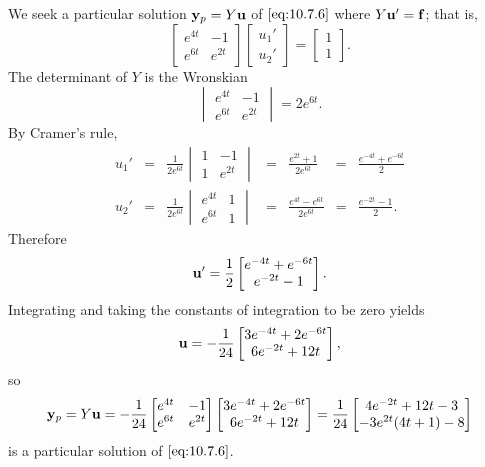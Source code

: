 \documentclass{ximera}
\begin{document}
\begin{example}
\begin{explanation}
We seek a particular solution
${\bf y}_p=Y{\bf u}$ of $\eqref{eq:10.7.6}$ where
 $Y{\bf u}'={\bf f}$; that is,
$$
\begin{bmatrix} e^{4t}&-1\\e^{6t}&e^{2t}\end{bmatrix}
\begin{bmatrix}u_1'\\u_2'\end{bmatrix}=\begin{bmatrix}1\\1\end{bmatrix}.
$$
The determinant of $Y$ is the Wronskian
$$
\begin{vmatrix}
e^{4t}&-1\\e^{6t}&e^{2t}\end{vmatrix}=2e^{6t}.
$$
By Cramer's rule,
$$
\begin{array}{cccccll}
u_1'&=&\frac{1}{2e^{6t}}\begin{vmatrix}1&-1\\1&e^{2t}
\end{vmatrix}&=&\frac{e^{2t}+1}{2e^{6t}}&=&\frac{e^{-4t}+e^{-6t}}{2}
\\
u_2'&=&\frac{1}{2e^{6t}}\begin{vmatrix}e^{4t}&1\\e^{6t}&1
\end{vmatrix}&=&\frac{e^{4t}-e^{6t}}{2e^{6t}}&=&\frac{e^{-2t}-1}{2}.
\end{array}
$$
Therefore
$$
{\bf
u}'=\frac{1}{2}\begin{bmatrix}e^{-4t}+e^{-6t}\\e^{-2t}-1\end{bmatrix}.
$$
Integrating  and taking the constants of integration to be zero yields
$$
{\bf
u}=-\frac{1}{24}\begin{bmatrix}3e^{-4t}+2e^{-6t}\\6e^{-2t}+12t\end{bmatrix},
$$
so
$$
{\bf y}_p=Y{\bf u}=
-\frac{1}{24}\begin{bmatrix}e^{4t}&-1\\e^{6t}&e^{2t}\end{bmatrix}
\begin{bmatrix}3e^{-4t}+2e^{-6t}\\6e^{-2t}+12t\end{bmatrix}
=\frac{1}{24}\begin{bmatrix}4e^{-2t}+12t-3\\-3e^{2t}(4t+1)-8\end{bmatrix}
$$
is a particular solution of  $\eqref{eq:10.7.6}$.
\end{explanation}
\end{example}
\end{document}
